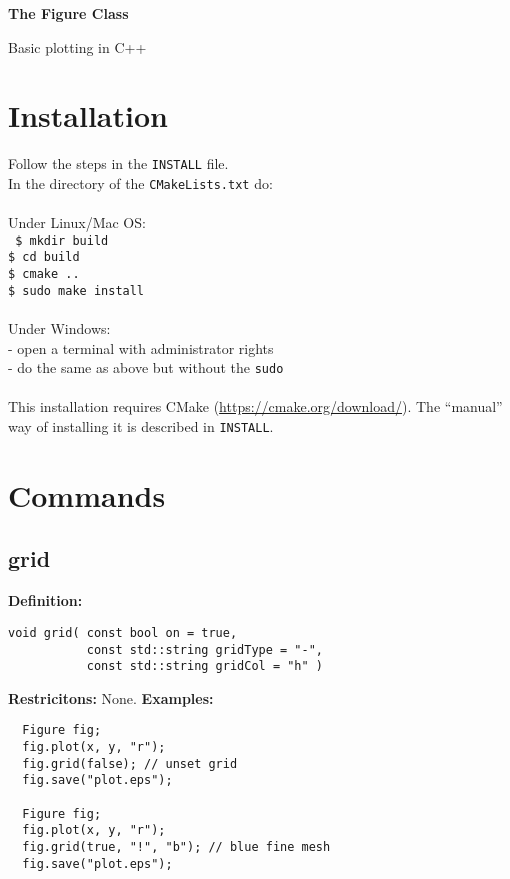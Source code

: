 \documentclass[a4paper]{article}
\newcommand{\command}[1]{\subsection{#1}}
\begin{document}
\begin{center}
  \begin{huge}
    \textbf{The Figure Class\\}
  \end{huge}
  Basic plotting in C++
\end{center}
  

\tableofcontents

\section{Installation}

Follow the steps in the \texttt{INSTALL} file. \\
In the directory of the \texttt{CMakeLists.txt} do: \\ \\
Under Linux/Mac OS: \\
\texttt{
\indent   \$ mkdir build \\
\indent   \$ cd build \\
\indent   \$ cmake .. \\
\indent   \$ sudo make install \\ \\
}
Under Windows: \\
\indent    - open a terminal with administrator rights \\
\indent    - do the same as above but without the \texttt{sudo} \\ \\
%
This installation requires CMake (\url{https://cmake.org/download/}). 
The ``manual'' way of installing it is described in \texttt{INSTALL}.


\section{Commands}

\command{grid}

\textbf{Definition:}
\begin{lstlisting}
void grid( const bool on = true, 
           const std::string gridType = "-", 
           const std::string gridCol = "h" )
\end{lstlisting}
%
\textbf{Restricitons:} None.
%
\textbf{Examples:}
\begin{lstlisting}
  Figure fig;
  fig.plot(x, y, "r");
  fig.grid(false); // unset grid
  fig.save("plot.eps");

  Figure fig;
  fig.plot(x, y, "r");
  fig.grid(true, "!", "b"); // blue fine mesh
  fig.save("plot.eps");
\end{lstlisting}
\end{document}
